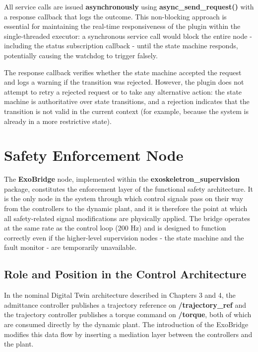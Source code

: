All service calls are issued \textbf{asynchronously} using \textbf{async\_send\_request()} with a response callback that logs the outcome. This non-blocking approach is essential for maintaining the real-time responsiveness of the plugin within the single-threaded executor: a synchronous service call would block the entire node - including the status subscription callback - until the state machine responds, potentially causing the watchdog to trigger falsely.

The response callback verifies whether the state machine accepted the request and logs a warning if the transition was rejected. However, the plugin does not attempt to retry a rejected request or to take any alternative action: the state machine is authoritative over state transitions, and a rejection indicates that the transition is not valid in the current context (for example, because the system is already in a more restrictive state).





\section{Safety Enforcement Node}
The \textbf{ExoBridge} node, implemented within the \textbf{exoskeletron\_supervision} package, constitutes the enforcement layer of the functional safety architecture. It is the only node in the system through which control signals pass on their way from the controllers to the dynamic plant, and it is therefore the point at which all safety-related signal modifications are physically applied. The bridge operates at the same rate as the control loop (200 Hz) and is designed to function correctly even if the higher-level supervision nodes - the state machine and the fault monitor - are temporarily unavailable.

\subsection{Role and Position in the Control Architecture}
In the nominal Digital Twin architecture described in Chapters 3 and 4, the admittance controller publishes a trajectory reference on \textbf{/trajectory\_ref} and the trajectory controller publishes a torque command on \textbf{/torque}, both of which are consumed directly by the dynamic plant. The introduction of the ExoBridge modifies this data flow by inserting a mediation layer between the controllers and the plant.

